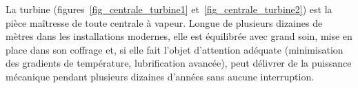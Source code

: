 		La turbine (figures~\ref{fig_centrale_turbine1} et~\ref{fig_centrale_turbine2}) est la pièce maîtresse de toute centrale à vapeur. Longue de plusieurs dizaines de mètres dans les installations modernes, elle est équilibrée avec grand soin, mise en place dans son coffrage et, si elle fait l’objet d’attention adéquate (minimisation des gradients de température, lubrification avancée), peut délivrer de la puissance mécanique pendant plusieurs dizaines d’années sans aucune interruption.

